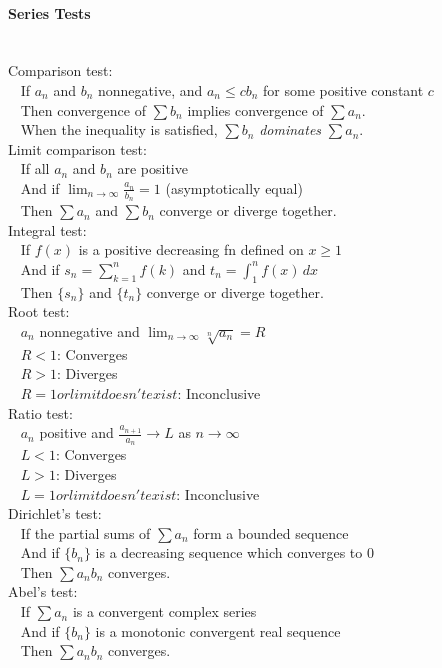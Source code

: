 \documentclass[10pt]{article}
\begin{document}
\paragraph{Series Tests}\ \\
Comparison test:\\
$\phantom{x}$ If $a_n$ and $b_n$ nonnegative, and $a_n \leq cb_n$ for some positive constant $c$\\
$\phantom{x}$ Then convergence of $\sum b_n$ implies convergence of $\sum a_n$.\\
$\phantom{x}$ When the inequality is satisfied, $\sum b_n$ {\it dominates} $\sum a_n$.\\
Limit comparison test:\\
$\phantom{x}$ If all $a_n$ and $b_n$ are positive\\
$\phantom{x}$ And if $\lim_{n\to\infty}\frac{a_n}{b_n}=1$ (asymptotically equal)\\
$\phantom{x}$ Then $\sum a_n$ and $\sum b_n$ converge or diverge together.\\
Integral test:\\
$\phantom{x}$ If $f(x)$ is a positive decreasing fn defined on $x\geq1$\\
$\phantom{x}$ And if $s_n=\sum_{k=1}^nf(k)$ and $t_n=\int_1^nf(x)\,dx$\\
$\phantom{x}$ Then $\{s_n\}$ and $\{t_n\}$ converge or diverge together.\\
Root test:\\
$\phantom{x}$ $a_n$ nonnegative and $\lim_{n\to\infty}\sqrt[n]{a_n}=R$\\
$\phantom{x}$ $R<1$: Converges\\
$\phantom{x}$ $R>1$: Diverges\\
$\phantom{x}$ $R=1 or limit doesn't exist$: Inconclusive\\
Ratio test:\\
$\phantom{x}$ $a_n$ positive and $\frac{a_{n+1}}{a_n}\to L$ as $n \to \infty$\\
$\phantom{x}$ $L < 1$: Converges\\
$\phantom{x}$ $L > 1$: Diverges\\
$\phantom{x}$ $L = 1 or limit doesn't exist$: Inconclusive\\
Dirichlet's test:\\
$\phantom{x}$ If the partial sums of $\sum a_n$ form a bounded sequence\\
$\phantom{x}$ And if $\{b_n\}$ is a decreasing sequence which converges to $0$\\
$\phantom{x}$ Then $\sum a_nb_n$ converges.\\
Abel's test:\\
$\phantom{x}$ If $\sum a_n$ is a convergent complex series\\
$\phantom{x}$ And if $\{b_n\}$ is a monotonic convergent real sequence\\
$\phantom{x}$ Then $\sum a_nb_n$ converges.
\end{document}
